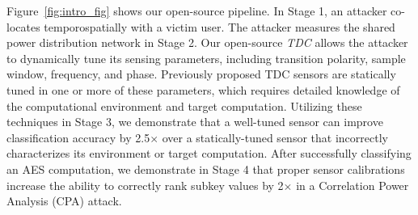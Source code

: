 Figure~\ref{fig:intro_fig} shows our open-source pipeline. In Stage \textcircled{\raisebox{-.8pt} {1}}, an attacker co-locates temporospatially with a victim user. %
The attacker measures the shared power distribution network in Stage \textcircled{\raisebox{-.8pt} {2}}. Our open-source \textit{\name TDC} allows the attacker to dynamically tune its sensing parameters, including transition polarity, sample window, frequency, and phase. Previously proposed TDC sensors are statically tuned in one or more of these parameters, which requires detailed knowledge of the computational environment and target computation. Utilizing these techniques in Stage \textcircled{\raisebox{-.8pt} {3}}, we demonstrate that a well-tuned sensor can improve classification accuracy by 2.5$\times$ over a statically-tuned sensor that incorrectly characterizes its environment or target computation. After successfully classifying an AES computation, we demonstrate in Stage \textcircled{\raisebox{-.8pt} {4}} that proper sensor calibrations increase the ability to correctly rank subkey values by 2$\times$ in a Correlation Power Analysis (CPA) attack.




